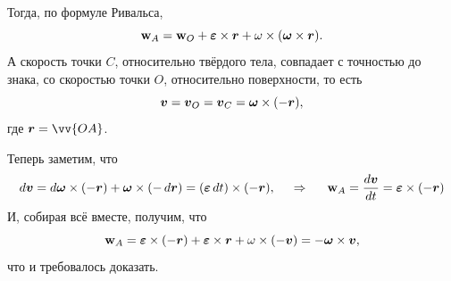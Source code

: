 Тогда, по формуле Ривальса,
$$
    \mbox{\boldmath $\mathrm{w}$}_A = \mbox{\boldmath $\mathrm{w}$}_O + \mbox{\boldmath $\varepsilon$} \times \mbox{\boldmath $r$} + \omega \times (\mbox{\boldmath $\omega$} \times \mbox{\boldmath $r$}).
$$
А скорость точки $C$, относительно твёрдого тела, совпадает с точностью до знака, со скоростью точки $O$, относительно поверхности, то есть 
$$
    \mbox{\boldmath $v$}= \mbox{\boldmath $v$}_O = \mbox{\boldmath $v$}_C = \mbox{\boldmath $\omega$} \times (-\mbox{\boldmath $r$}),
$$
где $\vc{r} = \vv{OA}$. 

Теперь заметим, что
$$
    d \mbox{\boldmath $v$} = d \mbox{\boldmath $\omega$} \times (-\mbox{\boldmath $r$}) + \mbox{\boldmath $\omega$} \times (- \, d \mbox{\boldmath $r$})
     = (\mbox{\boldmath $\varepsilon$} \, d t) \times (-\mbox{\boldmath $r$}),
     \hspace{0.5cm} \Rightarrow \hspace{0.5cm} 
     \mbox{\boldmath $\mathrm{w}$}_A = \frac{d \mbox{\boldmath $v$}}{d t}  = \mbox{\boldmath $\varepsilon$} \times (-\mbox{\boldmath $r$})
$$
И, собирая всё вместе, получим, что
$$
    \mbox{\boldmath $\mathrm{w}$}_A = \mbox{\boldmath $\varepsilon$} \times (-\mbox{\boldmath $r$}) + \mbox{\boldmath $\varepsilon$} \times \mbox{\boldmath $r$} + \omega \times (-\mbox{\boldmath $v$}) = - \mbox{\boldmath $\omega$} \times \mbox{\boldmath $v$},
$$
что и требовалось доказать.


